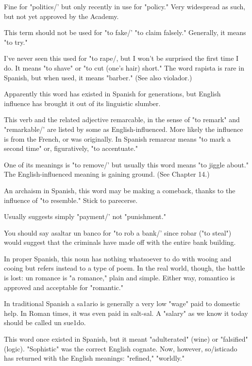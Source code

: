 { Fine for "politics/' but only recently in use for "policy." Very widespread as such, but not yet approved by the Academy.

 This term should not be used for "to fake/' "to
claim falsely." Generally, it means "to try."

 I've never seen this used for "to rape/, but I won't be
surprised the first time I do. It means "to shave" or "to cut (one's hair)
short." The word rapista is rare in Spanish, but when used, it means
"barber." (See also violador.)

 Apparently this word has existed in Spanish
for generations, but English influence has brought it out of its linguistic slumber.

 This verb and the related adjective remarcable,
in the sense of "to remark" and "remarkable/' are listed by some as
English-influenced. More likely the influence is from the French, or
was originally. In Spanish remarcar means "to mark a second time"
or, figuratively, "to accentuate."

 One of its meanings is "to remove/' but usually
this word means "to jiggle about." The English-influenced meaning is
gaining ground. (See Chapter 14.)

 An archaism in Spanish, this word may be
making a comeback, thanks to the influence of "to resemble." Stick to
parecerse.

 Usually suggests simply "payment/' not
"punishment."

 You should say asaltar un banco for "to
rob a bank/' since robar ("to steal") would suggest that the criminals
have made off with the entire bank building.

 In proper Spanish, this noun has nothing whatsoever to do with wooing and cooing but refers instead to a type of
poem. In the real world, though, the battle is lost: un romance is "a
romance," plain and simple. Either way, romantico is approved and acceptable for "romantic."

 In traditional Spanish a sa1ario is generally a very
low "wage" paid to domestic help. In Roman times, it was even paid in
salt-sal. A "salary" as we know it today should be called un sue1do.

 This word once existed in Spanish, but it
meant "adulterated" (wine) or "falsified" (logic). "Sophistic" was
the correct English cognate. Now, however, so/isticado has returned
with the English meanings: "refined," "worldly."

}
